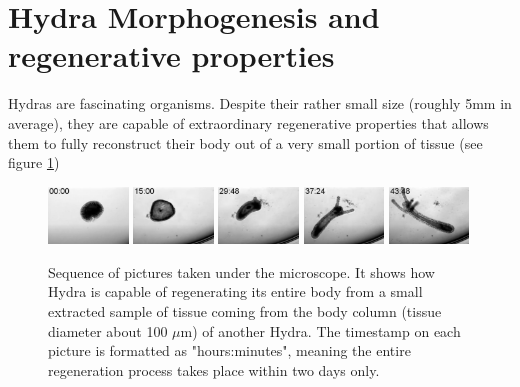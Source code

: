 
\section{Hydra Morphogenesis and regenerative properties}

Hydras are fascinating organisms. Despite their rather small size (roughly 5mm in average), they are capable of extraordinary regenerative properties that allows them to fully reconstruct their body out of a very small portion of tissue (see figure \ref{hydraregen}) 

\begin{figure}
\label{hydraregen}
\includegraphics[width=0.19\textwidth]{figures/hydra_growth1}
\includegraphics[width=0.19\textwidth]{figures/hydra_growth2}
\includegraphics[width=0.19\textwidth]{figures/hydra_growth3}	\includegraphics[width=0.19\textwidth]{figures/hydra_growth4}
\includegraphics[width=0.19\textwidth]{figures/hydra_growth5}
\caption{Sequence of pictures taken under the microscope. It shows how Hydra is capable of regenerating its entire body from a small extracted sample of tissue coming from the body column (tissue diameter about 100 $\mu$m) of another Hydra. The timestamp on each picture is formatted as "hours:minutes", meaning the entire regeneration process takes place within two days only.}
\end{figure}

